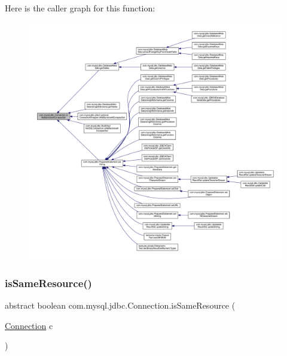 Here is the caller graph for this function\+:\nopagebreak
\begin{figure}[H]
\begin{center}
\leavevmode
\includegraphics[width=350pt]{interfacecom_1_1mysql_1_1jdbc_1_1_connection_a3465592f69365c9572cc404ae04375b4_icgraph}
\end{center}
\end{figure}
\mbox{\label{interfacecom_1_1mysql_1_1jdbc_1_1_connection_a3663c7e933a14a8cc26e16d0f78956a6}} 
\subsubsection{\texorpdfstring{is\+Same\+Resource()}{isSameResource()}}
{\footnotesize\ttfamily abstract boolean com.\+mysql.\+jdbc.\+Connection.\+is\+Same\+Resource (\begin{DoxyParamCaption}\item[{\mbox{\hyperlink{interfacecom_1_1mysql_1_1jdbc_1_1_connection}{Connection}}}]{c }\end{DoxyParamCaption})\hspace{0.3cm}{\ttfamily [abstract]}}

